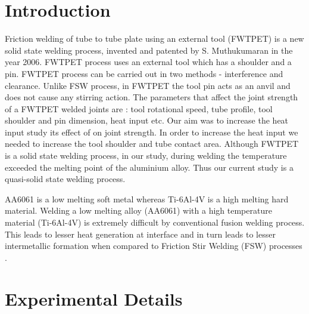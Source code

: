 \documentclass[3p]{elsarticle}
\begin{document}
\linenumbers
								
\section{Introduction}
\label{sec:Introduction}
Friction welding of tube to tube plate using an external tool (FWTPET) is a new solid state welding process, invented and patented by S. Muthukumaran in the year 2006. FWTPET process uses an external tool which has a shoulder and a pin. FWTPET process can be carried out in two methods - interference and clearance. Unlike FSW process, in FWTPET the tool pin acts as an anvil and does not cause any stirring action\cite{SenthilKumaran2011}. The parameters that affect the joint strength of a FWTPET welded joints are : tool rotational speed, tube profile, tool shoulder and pin dimension, heat input etc. Our aim was to increase the heat input study its effect of on joint strength. In order to increase the heat input we needed to increase the tool shoulder and tube contact area. 
Although FWTPET is a solid state welding process, in our study, during welding the temperature exceeded the melting point of the aluminium alloy. Thus our current study is a quasi-solid state welding process. 
\par 
AA6061 is a low melting soft metal whereas Ti-6Al-4V is a high melting hard material. Welding a low melting alloy (AA6061) with a high temperature material (Ti-6Al-4V) is extremely difficult by conventional fusion welding process. This leads to lesser heat generation at interface and in turn leads to lesser intermetallic formation when compared to Friction Stir Welding (FSW) processes \cite{MadhusudhanReddy2009}.


\section{Experimental Details} 
\label{sec:Experimental Details}
\end{document}
